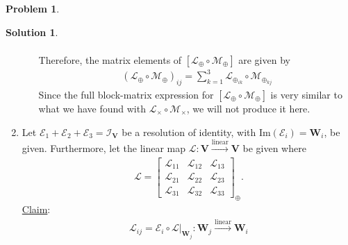 \documentclass{article}
\theoremstyle{definition}
\newtheorem*{prob*}{Problem}
\newtheorem*{sln*}{Solution}
\newcommand{\V}{\mathbf{V}}
\newcommand{\W}{\mathbf{W}}
\newcommand{\lag}{\mathcal{L}}
\newcommand{\M}{\mathcal{M}}
\newcommand{\E}{\mathcal{E}}
\newcommand{\ima}{\text{Im}}
\newcommand{\lin}{\overset{\text{linear}}{\longrightarrow}}
\begin{document}
\begin{prob*}
\begin{sln*}
\begin{enumerate}
\begin{enumerate}
\begin{align*}
				\end{align*}
				Therefore, the matrix elements of $[\lag_\oplus\circ \M_\oplus]$ are given by
				\begin{align*}
				\boxed{(\lag_\oplus\circ\M_\oplus)_{ij} = \sum^3_{k=1}\lag_{\oplus_{ik}}\circ\M_{\oplus_{kj}}}
				\end{align*}
				Since the full block-matrix expression for $[\lag_\oplus\circ \M_\oplus]$ is very similar to what we have found with $\lag_\times \circ \M_\times$, we will not produce it here.
			\end{enumerate}
			
			
			
			
			
			
			
			
			\newpage
			
			
			
		
			
			
			
			
			
			\item Let $\E_1 + \E_2 + \E_3 = \mathcal{I}_\V$ be a resolution of identity, with $\ima(\E_i) = \W_i$, be given. Furthermore, let the linear map $\lag : \V \lin \V$ be given where
			\begin{align*}
			\lag = \begin{bmatrix}
			\lag_{11} & \lag_{12} & \lag_{13}\\
			\lag_{21} & \lag_{22} & \lag_{23}\\
			\lag_{31} & \lag_{32} & \lag_{33}
			\end{bmatrix}_\oplus.
			\end{align*} 
			\underline{Claim}: 
			\begin{align*}
			\boxed{\lag_{ij} =  \E_{i} \circ \lag\bigg\vert_{\W_j} : \W_j \lin \W_i}
			\end{align*}
			

\end{enumerate}
\end{sln*}
\end{prob*}
\end{document}
